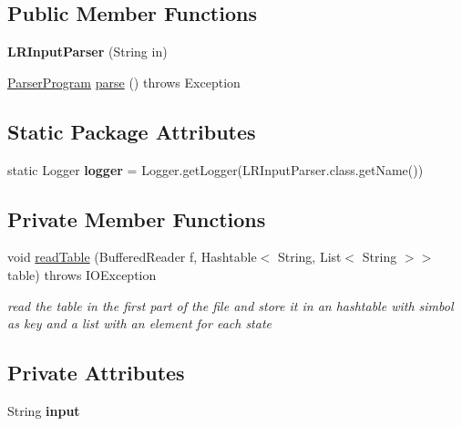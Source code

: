 \subsection*{Public Member Functions}
\begin{DoxyCompactItemize}
\item 
\hypertarget{classinput_parser_1_1_l_r_input_parser_a42f9947db4e863a82e3a8ca89c655c2a}{{\bfseries L\-R\-Input\-Parser} (String in)}\label{classinput_parser_1_1_l_r_input_parser_a42f9947db4e863a82e3a8ca89c655c2a}

\item 
\hyperlink{classparser_program_1_1_parser_program}{Parser\-Program} \hyperlink{classinput_parser_1_1_l_r_input_parser_ad81d1510d9b12b4b8b2dedbe117e88c1}{parse} ()  throws Exception 
\end{DoxyCompactItemize}
\subsection*{Static Package Attributes}
\begin{DoxyCompactItemize}
\item 
\hypertarget{classinput_parser_1_1_l_r_input_parser_ae3d6e07ebb7d4368f1a2e2ad05dae6f7}{static Logger {\bfseries logger} = Logger.\-get\-Logger(L\-R\-Input\-Parser.\-class.\-get\-Name())}\label{classinput_parser_1_1_l_r_input_parser_ae3d6e07ebb7d4368f1a2e2ad05dae6f7}

\end{DoxyCompactItemize}
\subsection*{Private Member Functions}
\begin{DoxyCompactItemize}
\item 
void \hyperlink{classinput_parser_1_1_l_r_input_parser_a1ade16089652dc354434e1ddb1769e96}{read\-Table} (Buffered\-Reader f, Hashtable$<$ String, List$<$ String $>$$>$ table)  throws I\-O\-Exception 
\begin{DoxyCompactList}\small\item\em read the table in the first part of the file and store it in an hashtable with simbol as key and a list with an element for each state \end{DoxyCompactList}\end{DoxyCompactItemize}
\subsection*{Private Attributes}
\begin{DoxyCompactItemize}
\item 
\hypertarget{classinput_parser_1_1_l_r_input_parser_a7f407afa631516efdbaf3cee992bb16f}{String {\bfseries input}}\label{classinput_parser_1_1_l_r_input_parser_a7f407afa631516efdbaf3cee992bb16f}

\end{DoxyCompactItemize}



